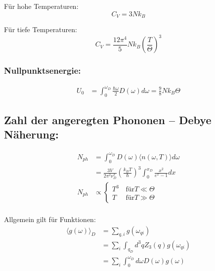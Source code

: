 Für hohe Temperaturen: 
\begin{equation*}
    C_V = 3N k_B
\end{equation*}

Für tiefe Temperaturen:
\begin{equation*}
    C_V = \frac{12 \pi^4}{5} N k_B \left(\frac{T}{\Theta}\right)^3
\end{equation*}

\subsubsection*{Nullpunktsenergie:}
\begin{equation*}
    \begin{aligned}
        U_0 &= \int_0^{\omega_D} \frac{\hbar \omega}{2} D(\omega) d\omega = \frac{9}{8} N k_B \Theta
    \end{aligned}
\end{equation*}

\vspace*{30pt}
\subsection*{Zahl der angeregten Phononen – Debye Näherung:}
\begin{equation*}
    \begin{aligned}
        N_{ph} &= \int_0^{\omega_D} D(\omega) \langle n (\omega,T) \rangle d\omega \\ 
        &= \frac{3V}{2 \pi^2 \nu_D^3} \left(\frac{k_B T}{\hbar}\right)^3 \int_0^{x_D} \frac{x^2}{e^x -1}dx \\
        N_{ph} &\propto \begin{cases}
            T^3 & \, \text{für} T \ll \Theta \\
            T &  \, \text{für} T \gg \Theta
            \end{cases} \\
    \end{aligned}
\end{equation*}

Allgemein gilt für Funktionen:
\begin{equation*}
    \begin{aligned}
        \langle g(\omega) \rangle_D &= \sum_{q,i} g(\omega_{qi}) \\
           &= \sum_i \int_{q_D} d^3 q Z_3(q) g(\omega_{qi}) \\
           &= \sum_i \int_0^{\omega_D} d\omega D(\omega) g(\omega)
    \end{aligned}
\end{equation*}

